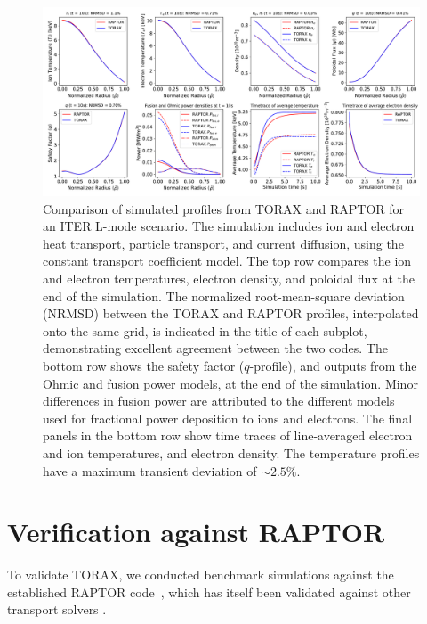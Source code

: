 \documentclass[aps, reprint, nofootinbib]{revtex4-2}
\begin{document}
\begin{figure}[hbt]
    \centering
    \includegraphics[width=1.0\textwidth]{figure6_verification1.pdf}
    \caption{\footnotesize Comparison of simulated profiles from TORAX and RAPTOR for an ITER L-mode scenario. The simulation includes ion and electron heat transport, particle transport, and current diffusion, using the constant transport coefficient model. The top row compares the ion and electron temperatures, electron density, and poloidal flux at the end of the simulation. The normalized root-mean-square deviation (NRMSD) between the TORAX and RAPTOR profiles, interpolated onto the same grid, is indicated in the title of each subplot, demonstrating excellent agreement between the two codes. The bottom row shows the safety factor ($q$-profile), and outputs from the Ohmic and fusion power models, at the end of the simulation. Minor differences in fusion power are attributed to the different models used for fractional power deposition to ions and electrons. The final panels in the bottom row show time traces of line-averaged electron and ion temperatures, and electron density. The temperature profiles have a maximum transient deviation of $\sim2.5\%$.}
    \label{fig:verification1}
\end{figure}

\section{Verification against RAPTOR}

To validate TORAX, we conducted benchmark simulations against the established RAPTOR code~\cite{felici:2012, felici:2018}, which has itself been validated against other transport solvers \cite{na:2019, vandeplassche:2020}. 
\end{document}
